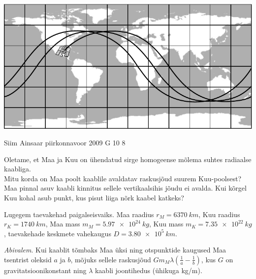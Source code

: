 \documentclass[11pt]{article}
\begin{document}
{{\begin{center}
	\includegraphics[width=\linewidth]{2005-v3g-09-yl}
\end{center}
\fi
}

{Siim Ainsaar} %
{piirkonnavoor} %
{2009} %
{G 10} %
{8} %
{
\ifStatement
Oletame, et Maa ja Kuu on ühendatud sirge homogeense mõlema suhtes radiaalse kaabliga.\\
\osa Mitu korda on Maa poolt kaablile avaldatav ras\-kus\-jõud suurem
Kuu-pool\-sest?\\
\osa Maa pinnal asuv kaabli kinnitus sellele vertikaalsihis jõudu ei avalda.
Kui kõrgel Kuu kohal asub punkt, kus pisut liiga nõrk kaabel katkeks?

Lugegem taevakehad paigalseisvaiks.
Maa raadius $r_M=\SI{6370}{km}$, Kuu raadius $r_K=\SI{1740}{km}$,
Maa mass $m_M=\SI{5,97e24}{kg}$, Kuu mass $m_K=\SI{7,35e22}{kg}$, taevakehade keskmete vahekaugus $D=\SI{3,80e5}{km}$.

\emph{Abivalem}. Kui kaablit tõmbaks Maa üksi ning otspunktide kaugused Maa
tsentrist oleksid $a$ ja $b$, mõjuks sellele raskusjõud $G m_M \lambda
\left( \tfrac1a - \tfrac1b \right)$,
kus $G$ on gravitatsioonikonstant ning $\lambda$ kaabli joontihedus (ühikuga \si{kg/m}).
\fi
}

}
\end{document}
